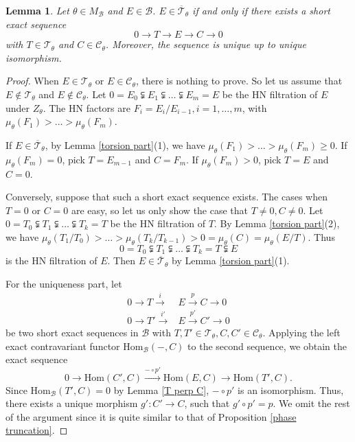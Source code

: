 \documentclass[a4paper,12pt]{amsart}
\numberwithin{equation}{section}
\newtheorem{lemma}[theorem]{Lemma}
\newcommand{\Hom}{\mathrm{Hom}}
\newcommand{\1}{\mathbf{1}}
\begin{document}
\begin{lemma}\label{torsion semistable decomposition}
    Let $\theta\in M_\mathcal{B}$ and $E\in\mathcal{B}$. $E\in\overline{\mathcal{T}}_\theta$ if and only if there exists a short exact sequence
    \[0\rightarrow T\rightarrow E\rightarrow C\rightarrow0\]
    with $T\in\mathcal{T}_\theta$ and $C\in\mathcal{C}_\theta$. Moreover, the sequence is unique up to unique isomorphism.
\end{lemma}
\begin{proof}
    When $E\in\mathcal{T}_\theta$ or $E\in\mathcal{C}_\theta$, there is nothing to prove. So let us assume that $E\notin\mathcal{T}_\theta$ and $E\notin\mathcal{C}_\theta$. Let $0=E_0\subsetneqq E_1\subsetneqq\dots\subsetneqq E_m=E$ be the HN filtration of $E$ under $Z_\theta$. The HN factors are $F_i=E_i/E_{i-1},i=1,\dots,m$, with $\mu_\theta(F_1)>\dots>\mu_\theta(F_m)$.

    If $E\in\overline{\mathcal{T}}_\theta$, by Lemma \ref{torsion part}(1), we have $\mu_\theta(F_1)>\dots>\mu_\theta(F_m)\geqslant0$. If $\mu_\theta(F_m)=0$, pick $T=E_{m-1}$ and $C=F_m$. If $\mu_\theta(F_m)>0$, pick $T=E$ and $C=0$.

    Conversely, suppose that such a short exact sequence exists. The cases when $T=0$ or $C=0$ are easy, so let us only show the case that $T\neq0,C\neq0$. Let $0=T_0\subsetneqq T_1\subsetneqq\dots\subsetneqq T_k=T$ be the HN filtration of $T$. By Lemma \ref{torsion part}(2), we have $\mu_\theta(T_1/T_0)>\dots>\mu_\theta(T_k/T_{k-1})>0=\mu_\theta(C)=\mu_\theta(E/T)$. Thus
    \[0=T_0\subsetneqq T_1\subsetneqq\dots\subsetneqq T_k=T\subsetneqq E\]
    is the HN filtration of $E$. Then $E\in\overline{\mathcal{T}}_\theta$ by Lemma \ref{torsion part}(1).

    For the uniqueness part, let
    \begin{align*}
    0\rightarrow T\xrightarrow{i} &E\xrightarrow{p} C\rightarrow0\\
        0\rightarrow T'\xrightarrow{i'} &E\xrightarrow{p'} C'\rightarrow0
    \end{align*}
     be two short exact sequences in $\mathcal{B}$ with $T,T'\in\mathcal{T}_\theta,C,C'\in\mathcal{C}_\theta$. Applying the left exact contravariant functor $\Hom_\mathcal{B}(-,C)$ to the second sequence, we obtain the exact sequence
    \[0\rightarrow\Hom(C',C)\xrightarrow{-\circ p'}\Hom(E,C)\rightarrow\Hom(T',C).\]
    Since $\Hom_\mathcal{B}(T',C)=0$ by Lemma \ref{T perp C}, $-\circ p'$ is an isomorphism. Thus, there exists a unique morphism $g':C'\rightarrow C$, such that $g'\circ p'=p$. We omit the rest of the argument since it is quite similar to that of Proposition \ref{phase truncation}.
\end{proof}
\end{document}
